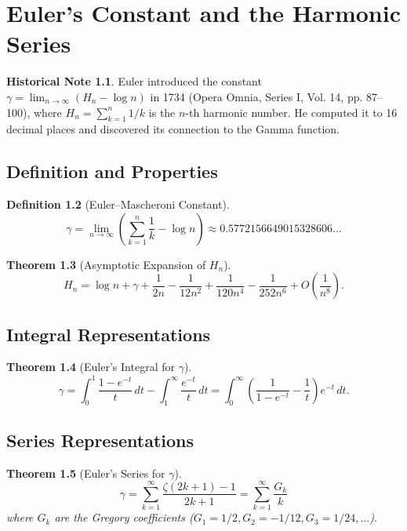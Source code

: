 \documentclass[11pt,a4paper,twoside]{book}
\theoremstyle{eulerstyle}
\newtheorem{theorem}{Theorem}[chapter]
\theoremstyle{definition}
\newtheorem{definition}[theorem]{Definition}
\newtheorem{historical}[theorem]{Historical Note}
\begin{document}
\chapter{Euler's Constant and the Harmonic Series}
\label{ch:harmonic}

\begin{historical}
Euler introduced the constant $\gamma = \lim_{n \to \infty} (H_n - \log n)$ in 1734 (Opera Omnia, Series I, Vol. 14, pp. 87--100), where $H_n = \sum_{k=1}^n 1/k$ is the $n$-th harmonic number. He computed it to 16 decimal places and discovered its connection to the Gamma function.
\end{historical}

\section{Definition and Properties}

\begin{definition}[Euler--Mascheroni Constant]
\[
\gamma = \lim_{n \to \infty} \left( \sum_{k=1}^n \frac{1}{k} - \log n \right) \approx 0.5772156649015328606\dots
\]
\end{definition}

\begin{theorem}[Asymptotic Expansion of $H_n$]
\[
H_n = \log n + \gamma + \frac{1}{2n} - \frac{1}{12n^2} + \frac{1}{120n^4} - \frac{1}{252n^6} + O\left(\frac{1}{n^8}\right).
\]
\end{theorem}

\section{Integral Representations}

\begin{theorem}[Euler's Integral for $\gamma$]
\[
\gamma = \int_0^1 \frac{1 - e^{-t}}{t}\, dt - \int_1^\infty \frac{e^{-t}}{t}\, dt
= \int_0^\infty \left(\frac{1}{1-e^{-t}} - \frac{1}{t}\right) e^{-t}\, dt.
\]
\end{theorem}

\section{Series Representations}

\begin{theorem}[Euler's Series for $\gamma$]
\[
\gamma = \sum_{k=1}^\infty \frac{\zeta(2k+1) - 1}{2k+1} = \sum_{k=1}^\infty \frac{G_k}{k}
\]
where $G_k$ are the Gregory coefficients ($G_1 = 1/2, G_2 = -1/12, G_3 = 1/24, \dots$).
\end{theorem}
\end{document}
